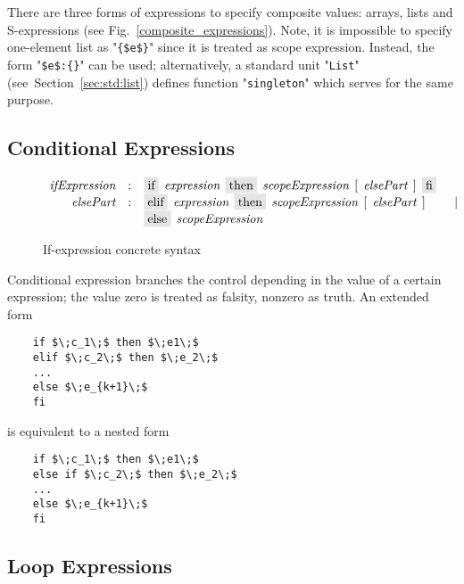 There are three forms of expressions to specify composite values: arrays, lists and S-expressions (see Fig.~\ref{composite_expressions}). Note, it is impossible
to specify one-element list as "\lstinline|{$e$}|" since it is treated as scope expression. Instead, the form "\lstinline|$e$:{}|" can be used; alternatively, a standard
unit "\lstinline|List|" (see~Section~\ref{sec:std:list}) defines function "\lstinline|singleton|" which serves for the same purpose.

\subsection{Conditional Expressions}

\begin{figure}[h]
  \[
    \begin{array}{rcll}
      \defterm{ifExpression}  & : & \term{if}\s\nonterm{expression}\s\term{then}\s\nonterm{scopeExpression}\s[\s\nonterm{elsePart}\s]\s\term{fi}&\\
      \defterm{elsePart}      & : & \term{elif}\s\nonterm{expression}\s\term{then}\s\nonterm{scopeExpression}\s[\s\nonterm{elsePart}\s]&\alt\\
                              &   & \term{else}\s\nonterm{scopeExpression}&
    \end{array}
  \]
  \caption{If-expression concrete syntax}
  \label{if_expression}
\end{figure}

Conditional expression branches the control depending in the value of a certain expression; the value zero is treated as falsity, nonzero as truth. An
extended form

\begin{lstlisting}
    if $\;c_1\;$ then $\;e1\;$
    elif $\;c_2\;$ then $\;e_2\;$
    ...
    else $\;e_{k+1}\;$
    fi
\end{lstlisting}

is equivalent to a nested form

\begin{lstlisting}
    if $\;c_1\;$ then $\;e1\;$
    else if $\;c_2\;$ then $\;e_2\;$
    ...
    else $\;e_{k+1}\;$
    fi
\end{lstlisting}

\FloatBarrier

\subsection{Loop Expressions}

